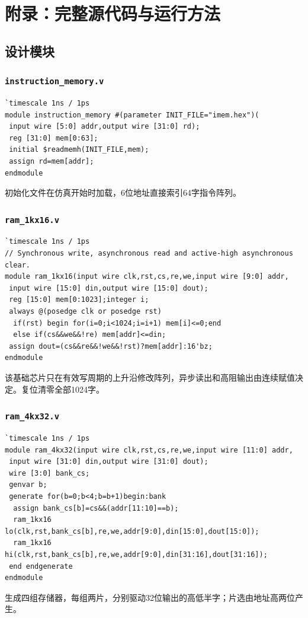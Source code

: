 \documentclass[12pt,a4paper]{ctexart}
\begin{document}
\section*{附录：完整源代码与运行方法}

\subsection*{设计模块}
\subsubsection*{\texttt{instruction\_memory.v}}
\begin{lstlisting}
`timescale 1ns / 1ps
module instruction_memory #(parameter INIT_FILE="imem.hex")(
 input wire [5:0] addr,output wire [31:0] rd);
 reg [31:0] mem[0:63];
 initial $readmemh(INIT_FILE,mem);
 assign rd=mem[addr];
endmodule
\end{lstlisting}
初始化文件在仿真开始时加载，6位地址直接索引64字指令阵列。

\subsubsection*{\texttt{ram\_1kx16.v}}
\begin{lstlisting}
`timescale 1ns / 1ps
// Synchronous write, asynchronous read and active-high asynchronous clear.
module ram_1kx16(input wire clk,rst,cs,re,we,input wire [9:0] addr,
 input wire [15:0] din,output wire [15:0] dout);
 reg [15:0] mem[0:1023];integer i;
 always @(posedge clk or posedge rst)
  if(rst) begin for(i=0;i<1024;i=i+1) mem[i]<=0;end
  else if(cs&&we&&!re) mem[addr]<=din;
 assign dout=(cs&&re&&!we&&!rst)?mem[addr]:16'bz;
endmodule
\end{lstlisting}
该基础芯片只在有效写周期的上升沿修改阵列，异步读出和高阻输出由连续赋值决定。复位清零全部1024字。

\subsubsection*{\texttt{ram\_4kx32.v}}
\begin{lstlisting}
`timescale 1ns / 1ps
module ram_4kx32(input wire clk,rst,cs,re,we,input wire [11:0] addr,
 input wire [31:0] din,output wire [31:0] dout);
 wire [3:0] bank_cs;
 genvar b;
 generate for(b=0;b<4;b=b+1)begin:bank
  assign bank_cs[b]=cs&&(addr[11:10]==b);
  ram_1kx16 lo(clk,rst,bank_cs[b],re,we,addr[9:0],din[15:0],dout[15:0]);
  ram_1kx16 hi(clk,rst,bank_cs[b],re,we,addr[9:0],din[31:16],dout[31:16]);
 end endgenerate
endmodule
\end{lstlisting}
生成四组存储器，每组两片，分别驱动32位输出的高低半字；片选由地址高两位产生。
\end{document}
